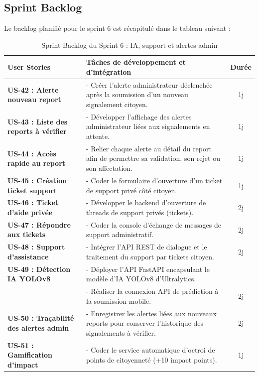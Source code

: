 \subsection{Sprint Backlog}
Le backlog planifié pour le sprint 6 est récapitulé dans le tableau suivant :

\begin{table}[H]
    \centering
    \caption{Sprint Backlog du Sprint 6 : IA, support et alertes admin}
    \label{tab:backlog_sprint6}
    \vspace{0.2cm}
    \scriptsize
    \begin{tabularx}{\textwidth}{|l|X|c|}
        \hline
        \textbf{User Stories} & \textbf{Tâches de développement et d'intégration} & \textbf{Durée} \\ \hline
        \textbf{US-42 : Alerte nouveau report} & 
        - Créer l'alerte administrateur déclenchée après la soumission d'un nouveau signalement citoyen. & 1j \\ \hline
        \textbf{US-43 : Liste des reports à vérifier} &
        - Développer l'affichage des alertes administrateur liées aux signalements en attente. & 1j \\ \hline
        \textbf{US-44 : Accès rapide au report} &
        - Relier chaque alerte au détail du report afin de permettre sa validation, son rejet ou son affectation. & 1j \\ \hline
        \textbf{US-45 : Création ticket support} &
        - Coder le formulaire d'ouverture d'un ticket de support privé côté citoyen. & 1j \\ \hline
        \textbf{US-46 : Ticket d'aide privée} &
        - Développer le backend d'ouverture de threads de support privés (tickets). & 2j \\ \hline
        \textbf{US-47 : Répondre aux tickets} &
        - Coder la console d'échange de messages de support administratif. & 2j \\ \hline
        \textbf{US-48 : Support d'assistance} &
        - Intégrer l'API REST de dialogue et le traitement du support par tickets citoyen. & 2j \\ \hline
        \textbf{US-49 : Détection IA YOLOv8} &
        - Déployer l'API FastAPI encapsulant le modèle d'IA YOLOv8 d'Ultralytics.\\
        & - Réaliser la connexion API de prédiction à la soumission mobile. & 2j \\ \hline
        \textbf{US-50 : Traçabilité des alertes admin} &
        - Enregistrer les alertes liées aux nouveaux reports pour conserver l'historique des signalements à vérifier. & 2j \\ \hline
        \textbf{US-51 : Gamification d'impact} &
        - Coder le service automatique d'octroi de points de citoyenneté (+10 impact points). & 1j \\ \hline
    \end{tabularx}
\end{table}

